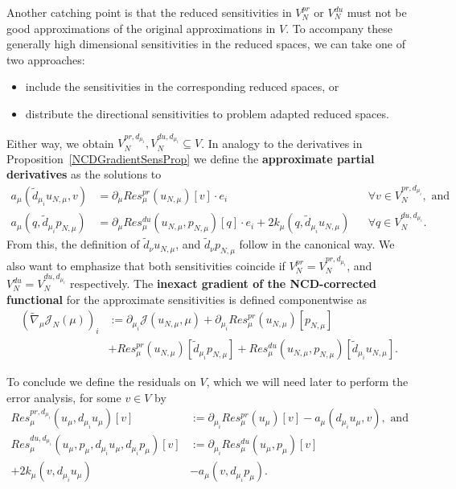 Another catching point is that the reduced sensitivities in $V_N^{pr}$ or $V_N^{du}$ must not be good approximations of the original approximations in $V$.
To accompany these generally high dimensional sensitivities in the reduced spaces, we can take one of two approaches:
\begin{itemize}
    \item include the sensitivities in the corresponding reduced spaces, or
    \item distribute the directional sensitivities to problem adapted reduced spaces.
\end{itemize}
Either way, we obtain $V_N^{pr, d_{\mu_i}}, V_N^{du, d_{\mu_i}} \subseteq V$.
In analogy to the derivatives in Proposition~\ref{NCDGradientSensProp} we define the \textbf{approximate partial derivatives} as the solutions to
\begin{align*}
    a_\mu(\tilde{d}_{\mu_i} u_{N, \mu}, v) &= \partial_\mu Res_\mu^{pr}(u_{N, \mu})[v] \cdot e_i &&\forall v \in V_N^{pr, d_{\mu_i}}, \text{ and} \\
    a_\mu(q, \tilde{d}_{\mu_i} p_{N, \mu}) &= \partial_\mu Res_\mu^{du}(u_{N, \mu}, p_{N, \mu})[q] \cdot e_i + 2 k_\mu(q, \tilde{d}_{\mu_i} u_{N, \mu}) &&\forall q \in V_N^{du, d_{\mu_i}}.
\end{align*}
From this, the definition of $\tilde{d}_{\nu} u_{N, \mu}$, and $\tilde{d}_{\nu} p_{N, \mu}$ follow in the canonical way.
We also want to emphasize that both sensitivities coincide if $V_N^{pr} = V_N^{pr, d_{\mu_i}}$, and $V_N^{du} = V_N^{du, d_{\mu_i}}$ respectively.
The \textbf{inexact gradient of the NCD-corrected functional} for the approximate sensitivities is defined componentwise as
\begin{align*}
    {\left( \tilde{\nabla}_\mu \mathcal{J}_N(\mu) \right)}_i &:= \partial_{\mu_i} \mathcal{J}(u_{N, \mu}, \mu) + \partial_{\mu_i} Res_\mu^{pr}(u_{N, \mu})[p_{N, \mu}] \\
    &+ Res_\mu^{pr}(u_{N, \mu})[\tilde{d}_{\mu_i} p_{N, \mu}] + Res_\mu^{du}(u_{N, \mu}, p_{N, \mu})[\tilde{d}_{\mu_i} u_{N, \mu}].
\end{align*}

To conclude we define the residuals on $V$, which we will need later to perform the error analysis, for some $v \in V$ by
\begin{align*}
    Res_\mu^{pr, d_{\mu_i}}(u_\mu, d_{\mu_i} u_\mu)[v] &:= \partial_{\mu_i} Res_\mu^{pr}(u_\mu)[v] - a_\mu(d_{\mu_i} u_\mu, v), \text{ and} \\
    Res_\mu^{du, d_{\mu_i}}(u_\mu, p_\mu, d_{\mu_i} u_\mu, d_{\mu_i} p_\mu)[v] &:= \partial_{\mu_i} Res_\mu^{du}(u_\mu, p_\mu)[v] \\
    + 2 k_\mu(v, d_{\mu_i} u_\mu) &- a_\mu(v, d_{\mu_i} p_\mu).
\end{align*}

